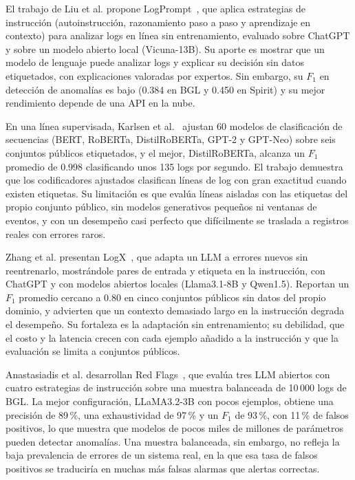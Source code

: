 El trabajo de Liu et al. propone LogPrompt~\cite{liu2024_logprompt}, que aplica estrategias de instrucción (autoinstrucción, razonamiento paso a paso y aprendizaje en contexto) para analizar logs en línea sin entrenamiento, evaluado sobre ChatGPT y sobre un modelo abierto local (Vicuna-13B). Su aporte es mostrar que un modelo de lenguaje puede analizar logs y explicar su decisión sin datos etiquetados, con explicaciones valoradas por expertos. Sin embargo, su $F_1$ en detección de anomalías es bajo (0.384 en BGL y 0.450 en Spirit) y su mejor rendimiento depende de una API en la nube.

En una línea supervisada, Karlsen et al.~\cite{karlsen2024_benchmark} ajustan 60 modelos de clasificación de secuencias (BERT, RoBERTa, DistilRoBERTa, GPT-2 y GPT-Neo) sobre seis conjuntos públicos etiquetados, y el mejor, DistilRoBERTa, alcanza un $F_1$ promedio de 0.998 clasificando unos 135 logs por segundo. El trabajo demuestra que los codificadores ajustados clasifican líneas de log con gran exactitud cuando existen etiquetas. Su limitación es que evalúa líneas aisladas con las etiquetas del propio conjunto público, sin modelos generativos pequeños ni ventanas de eventos, y con un desempeño casi perfecto que difícilmente se traslada a registros reales con errores raros.

Zhang et al. presentan LogX~\cite{zhang2024_logx}, que adapta un LLM a errores nuevos sin reentrenarlo, mostrándole pares de entrada y etiqueta en la instrucción, con ChatGPT y con modelos abiertos locales (Llama3.1-8B y Qwen1.5). Reportan un $F_1$ promedio cercano a 0.80 en cinco conjuntos públicos sin datos del propio dominio, y advierten que un contexto demasiado largo en la instrucción degrada el desempeño. Su fortaleza es la adaptación sin entrenamiento; su debilidad, que el costo y la latencia crecen con cada ejemplo añadido a la instrucción y que la evaluación se limita a conjuntos públicos.

Anastasiadis et al. desarrollan Red Flags~\cite{anastasiadis2026_redflags}, que evalúa tres LLM abiertos con cuatro estrategias de instrucción sobre una muestra balanceada de 10\,000 logs de BGL. La mejor configuración, LLaMA3.2-3B con pocos ejemplos, obtiene una precisión de 89\,\%, una exhaustividad de 97\,\% y un $F_1$ de 93\,\%, con 11\,\% de falsos positivos, lo que muestra que modelos de pocos miles de millones de parámetros pueden detectar anomalías. Una muestra balanceada, sin embargo, no refleja la baja prevalencia de errores de un sistema real, en la que esa tasa de falsos positivos se traduciría en muchas más falsas alarmas que alertas correctas.

